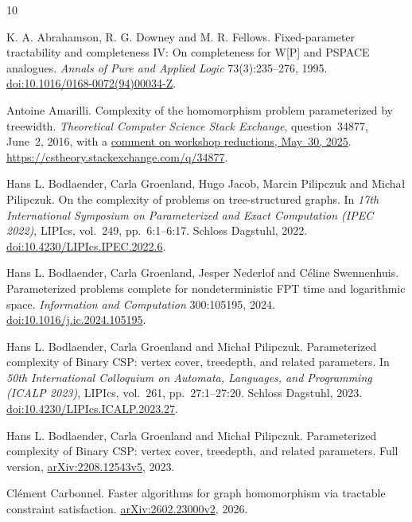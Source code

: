 \documentclass[11pt]{article}
\theoremstyle{remark}
\begin{document}
\begin{thebibliography}{10}
\raggedright
{}
K. A. Abrahamson, R. G. Downey and M. R. Fellows.
Fixed-parameter tractability and completeness IV: On completeness for
W[P] and PSPACE analogues. \emph{Annals of Pure and Applied Logic}
73(3):235--276, 1995.
\href{https://doi.org/10.1016/0168-0072(94)00034-Z}{doi:10.1016/0168-0072(94)00034-Z}.

Antoine Amarilli.
Complexity of the homomorphism problem parameterized by treewidth.
\emph{Theoretical Computer Science Stack Exchange}, question~34877,
June~2, 2016, with a
\href{https://cstheory.stackexchange.com/questions/34877/#comment124806_34877}{comment on workshop reductions, May~30, 2025}.
\url{https://cstheory.stackexchange.com/q/34877}.

Hans L. Bodlaender, Carla Groenland, Hugo Jacob, Marcin Pilipczuk and
Micha{\l} Pilipczuk.
On the complexity of problems on tree-structured graphs.
In \emph{17th International Symposium on Parameterized and Exact Computation
(IPEC 2022)}, LIPIcs, vol.~249, pp.~6:1--6:17. Schloss Dagstuhl, 2022.
\href{https://doi.org/10.4230/LIPIcs.IPEC.2022.6}{doi:10.4230/LIPIcs.IPEC.2022.6}.

Hans L. Bodlaender, Carla Groenland, Jesper Nederlof and C\'eline Swennenhuis.
Parameterized problems complete for nondeterministic FPT time and
logarithmic space.
\emph{Information and Computation} 300:105195, 2024.
\href{https://doi.org/10.1016/j.ic.2024.105195}{doi:10.1016/j.ic.2024.105195}.

Hans L. Bodlaender, Carla Groenland and Micha{\l} Pilipczuk.
Parameterized complexity of Binary CSP: vertex cover, treedepth, and
related parameters.
In \emph{50th International Colloquium on Automata, Languages, and Programming
(ICALP 2023)}, LIPIcs, vol.~261, pp.~27:1--27:20. Schloss Dagstuhl, 2023.
\href{https://doi.org/10.4230/LIPIcs.ICALP.2023.27}{doi:10.4230/LIPIcs.ICALP.2023.27}.

Hans L. Bodlaender, Carla Groenland and Micha{\l} Pilipczuk.
Parameterized complexity of Binary CSP: vertex cover, treedepth, and
related parameters.
Full version, \href{https://arxiv.org/abs/2208.12543v5}{arXiv:2208.12543v5}, 2023.

Cl\'ement Carbonnel.
Faster algorithms for graph homomorphism via tractable constraint satisfaction.
\href{https://arxiv.org/abs/2602.23000v2}{arXiv:2602.23000v2}, 2026.


\end{thebibliography}
\end{document}
